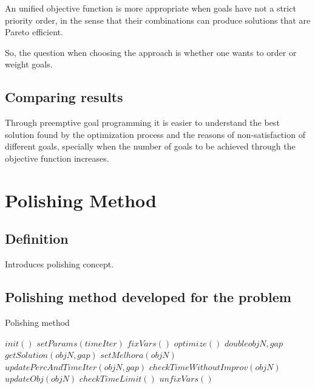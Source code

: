 An unified objective function is more appropriate when goals have not a strict priority order, in the sense that their combinations can produce solutions that are Pareto efficient.

So, the question when choosing the approach is whether one wants to order or weight goals.


\subsection{Comparing results}

Through preemptive goal programming it is easier to understand the best solution found by the optimization process and the reasons of non-satisfaction of different goals, specially when the number of goals to be achieved through the objective function increases.





\section{Polishing Method}

\subsection{Definition}

Introduces polishing concept.

\subsection{Polishing method developed for the problem}

\begin{algorithm}
  \caption{Polishing method
    \label{alg:polishing}}
  \begin{algorithmic}[1]
    \Statex
		
			\State $init()$
      \State $setParams(timeIter)$
          \State $fixVars()$
					\State $optimize()$
					\State $double objN, gap$
					\State $getSolution(objN, gap)$
					\State $setMelhora(objN)$
					\State $updatePercAndTimeIter(objN, gap)$
					\State $checkTimeWithoutImprov(objN)$
					\State $updateObj(objN)$
					\State $checkTimeLimit()$
					\State $unfixVars()$
      \EndWhile
     \State {}
    \EndFunction
  \end{algorithmic}
\end{algorithm}
		  	  


